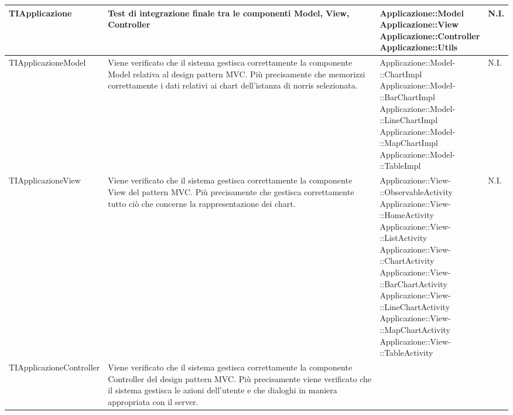 \begin{longtabu}{| X | X | X[0.9] | X[0.3] |}
			TIApplicazione &
			Test di integrazione finale tra le componenti Model, View, Controller
			& \parbox[t]{0.6\textwidth}{
			Applicazione::Model\\
			Applicazione::View\\
			Applicazione::Controller\\
			Applicazione::Utils}
			& N.I.
\\ \hline
			TIApplicazioneModel &
			Viene verificato che il sistema gestisca correttamente la componente Model relativa al design pattern MVC. Più precisamente che memorizzi correttamente i dati relativi ai chart dell'istanza di norris selezionata.
			& \parbox[t]{0.6\textwidth}{
			Applicazione::Model-\\::ChartImpl\\
			Applicazione::Model-\\::BarChartImpl\\
			Applicazione::Model-\\::LineChartImpl\\
			Applicazione::Model-\\::MapChartImpl\\
			Applicazione::Model-\\::TableImpl}
			& N.I.
\\ \hline
			TIApplicazioneView &
			Viene verificato che il sistema gestisca correttamente la componente View del pattern MVC. Più precisamente che gestisca correttamente tutto ciò che concerne la rappresentazione dei chart.
			& \parbox[t]{0.6\textwidth}{
			Applicazione::View-\\::ObservableActivity\\
			Applicazione::View-\\::HomeActivity\\
			Applicazione::View-\\::ListActivity\\
			Applicazione::View-\\::ChartActivity\\
			Applicazione::View-\\::BarChartActivity\\
			Applicazione::View-\\::LineChartActivity\\
			Applicazione::View-\\::MapChartActivity\\
			Applicazione::View-\\::TableActivity}
			& N.I.
\\ \hline
			TIApplicazioneController &
			Viene verificato che il sistema gestisca correttamente la componente Controller del design pattern MVC. Più precisamente viene verificato che il sistema gestisca le azioni dell’utente e che dialoghi in maniera appropriata con il server.

\end{longtabu}
